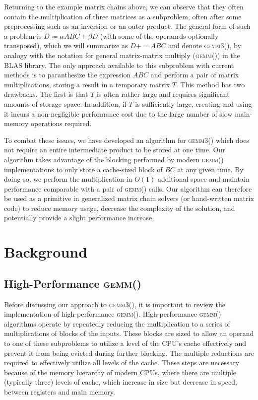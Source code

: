 \documentclass[12pt]{article}
\newcommand*{\pluseq}{\mathrel{{+}{=}}}
\newcommand*{\gemmt}{{\textsc{gemm3()}}}
\newcommand*{\gemm}{{\textsc{gemm()}}}
\begin{document}
Returning to the example matrix chains above, we can observe that they often contain the multiplication of three matrices as a subproblem, often after some preprocessing such as an inversion or an outer product.
The general form of such a problem is $D \coloneqq \alpha ABC + \beta D$ (with some of the operanrds optionally transposed), which we will summarize as $D \pluseq ABC$ and denote \gemmt{}, by analogy with the notation for general matrix-matrix multiply (\gemm{}) in the BLAS library.
The only approach available to this subproblem with current methods is to paranthesize the expression $ABC$ and perform a pair of matrix multiplications, storing a result in a temporary matrix $T$.
This method has two drawbacks.
The first is that $T$ is often rather large and requires significant amounts of storage space.
In addition, if $T$ is sufficiently large, creating and using it incurs a non-negligible performance cost due to the large number of slow main-memory operations required.

To combat these issues, we have developed an algorithm for \gemmt{} which does not require an entire intermediate product to be stored at one time.
Our algorithm takes advantage of the blocking performed by modern \gemm{} implementations to only store a cache-sized block of $BC$ at any given time.
By doing so, we perform the multiplication in $O(1)$ additional space and maintain performance comparable with a pair of \gemm{} calls.
Our algorithm can therefore be used as a primitive in generalized matrix chain solvers (or hand-written matrix code) to reduce memory usage, decrease the complexity of the solution, and potentially provide a slight performance increase.

\section{Background}
\subsection{High-Performance \gemm{}}
Before discussing our approach to \gemmt{}, it is important to review the implementation of high-performance \gemm{}.
High-performance \gemm{} algorithms operate by repeatedly reducing the multiplication to a series of multiplications of blocks of the inputs.
These blocks are sized to allow an operand to one of these subproblems to utilize a level of the CPU's cache effectively and prevent it from being evicted during further blocking.
The multiple reductions are required to effectively utilize all levels of the cache.
These steps are necessary because of the memory hierarchy of modern CPUs, where there are multiple (typically three) levels of cache, which increase in size but decrease in speed, between registers and main memory.
\end{document}

